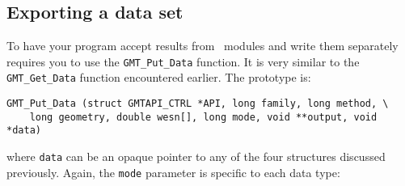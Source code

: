 \documentclass{report}
\begin{document}
\subsection{Exporting a data set}

To have your program accept results from \GMT\ modules and write them
separately requires you to use the \texttt{GMT\_Put\_Data} function.  It is
very similar to the \texttt{GMT\_Get\_Data} function encountered earlier.
The prototype is:

\begin{verbatim}
GMT_Put_Data (struct GMTAPI_CTRL *API, long family, long method, \
    long geometry, double wesn[], long mode, void **output, void *data)
\end{verbatim}
where \texttt{data} can be an opaque pointer to any of the four structures
discussed previously.  Again, the \texttt{mode} parameter is specific to
each data type:
\end{document}
